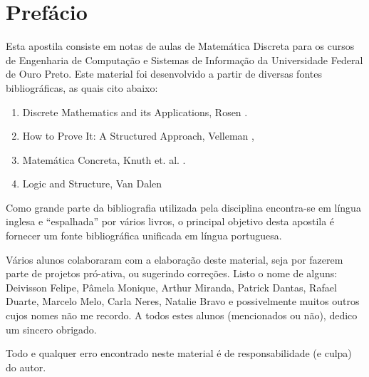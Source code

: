\chapter*{Prefácio}

Esta apostila consiste em notas de aulas de Matemática Discreta para
os cursos de Engenharia de Computação e Sistemas de Informação da
Universidade Federal de Ouro Preto. Este material foi desenvolvido a
partir de diversas fontes bibliográficas, as quais cito abaixo:
\begin{enumerate}
  \item Discrete Mathematics and its Applications, Rosen \cite{Rosen02}.
  \item How to Prove It: A Structured Approach, Velleman
    \cite{Velleman06},
  \item Matemática Concreta, Knuth et. al. \cite{Graham94}.
  \item Logic and Structure, Van Dalen \cite{Dalen94}
\end{enumerate}

Como grande parte da bibliografia utilizada pela disciplina
encontra-se em língua inglesa e ``espalhada'' por vários livros,
o principal objetivo desta apostila é fornecer um fonte bibliográfica
unificada em língua portuguesa.

Vários alunos colaboraram com a elaboração deste material, seja por
fazerem parte de projetos pró-ativa, ou sugerindo correções. Listo o
nome de alguns: Deivisson Felipe, Pâmela Monique, Arthur
Miranda, Patrick Dantas, Rafael Duarte, Marcelo Melo, Carla Neres,
Natalie Bravo e possivelmente muitos outros cujos nomes não me recordo.
A todos estes alunos (mencionados ou não), dedico um sincero obrigado.

Todo e qualquer erro encontrado neste material é de responsabilidade (e culpa)
do autor.
